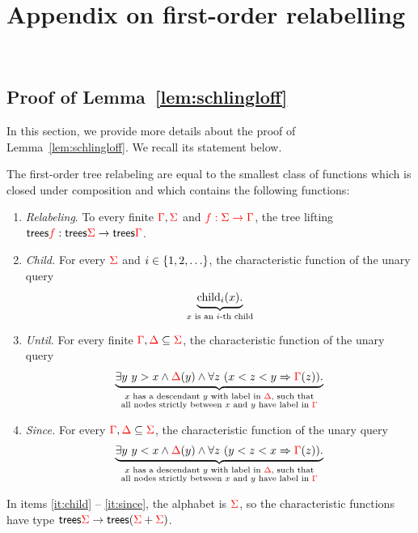 \section{Appendix on first-order relabelling}~\label{sec:AppendixForat}

\subsection{Proof of Lemma~\ref{lem:schlingloff}}

In this section, we provide more details about the proof of Lemma~\ref{lem:schlingloff}. We recall its statement below.

\begin{lemma} The first-order tree relabeling are equal to the smallest class of functions which is closed under composition and which  contains the following functions:
    \begin{enumerate}
        \item \label{it:relabeling} \emph{Relabeling}. To every finite ${\color{red}{\Gamma}},{\color{red}{\Sigma}}$ and ${\color{red}{f : {\color{red}{\Sigma}}\to {\color{red}{\Gamma}}}}$, the tree lifting $\mathsf {trees} {\color{red}{f}} : \mathsf {trees} {\color{red}{\Sigma}} \to \mathsf {trees} {\color{red}{\Gamma}}$.
        \item \label{it:child} \emph{Child.} For every ${\color{red}{\Sigma}}$ and  $i \in \{1,2,\ldots\}$, the characteristic function of the  unary query 
        \begin{align*}
            \underbrace{\mathrm{child}_{i} (x).}_{\text{$x$ is an $i$-th child}}
        \end{align*}
         \item \label{it:until} \emph{Until.} For every finite ${\color{red}{\Gamma}}, {\color{red}{\Delta}} \subseteq {\color{red}{\Sigma}}$,  the characteristic function of the unary query
         \begin{align*}
              \underbrace{\exists y\ y > x \land {\color{red}{\Delta}}(y) \land  \forall z \ (x < z < y \Rightarrow {\color{red}{\Gamma}}(z)).}_{\substack{\text{$x$ has a descendant $y$ with label in ${\color{red}{\Delta}}$, such that}\\ \text{all nodes strictly between $x$ and $y$ have label in ${\color{red}{\Gamma}}$}}} 
         \end{align*} 
         \item \label{it:since}\emph{Since.} For every ${\color{red}{\Gamma}}, {\color{red}{\Delta}} \subseteq {\color{red}{\Sigma}}$,    the characteristic function of the unary query
         \begin{align*}
              \underbrace{\exists y\ y < x \land {\color{red}{\Delta}}(y) \land  \forall z \ (y < z < x \Rightarrow {\color{red}{\Gamma}}(z)).}_{\substack{\text{$x$ has a descendant $y$ with label in ${\color{red}{\Delta}}$, such that}\\ \text{all nodes strictly between $x$ and $y$ have label in ${\color{red}{\Gamma}}$}}}  
         \end{align*} 
    \end{enumerate}
    In items \ref{it:child} -- \ref{it:since}, the alphabet is ${\color{red}{\Sigma}}$, so the characteristic functions have type $\mathsf {trees} {\color{red}{\Sigma}} \to \mathsf {trees}({\color{red}{\Sigma}} + {\color{red}{\Sigma}})$. 
\end{lemma}
